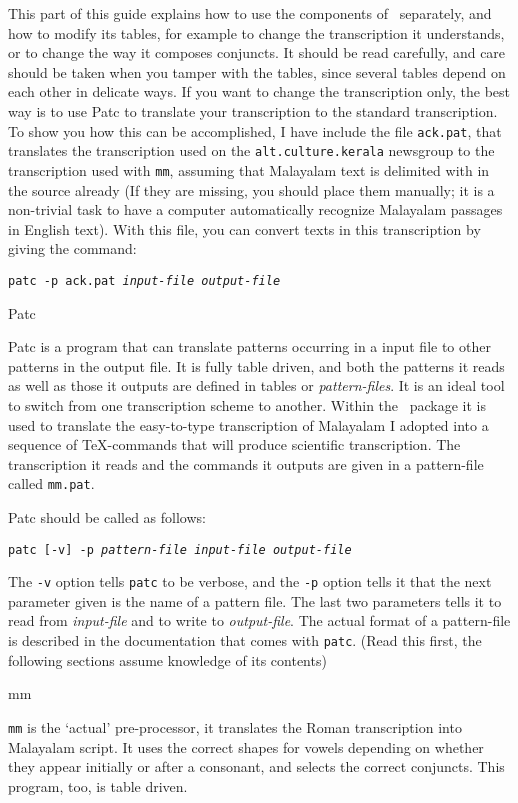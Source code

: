 This part of this guide explains how to use the components of
\MT\ separately, and how to modify its tables, for
example to change the transcription it understands, or to change the
way it composes conjuncts. It should be read carefully, and care
should be taken when you tamper with the tables, since several tables
depend on each other in delicate ways. If you want to change the
transcription only, the best way is to use Patc to translate your
transcription to the standard transcription. To show you how this
can be accomplished, I have include the file {\tt ack.pat}, that
translates the transcription used on the {\tt alt.culture.kerala} newsgroup
to the transcription used with {\tt mm}, assuming that Malayalam text
is delimited with {\tt\dollar} in the source already (If they are
missing, you should place them manually; it is a non-trivial
task to have a computer automatically recognize Malayalam passages in
English text). With this file, you can convert texts in this
transcription by giving the command:

\medskip
{\tt patc -p ack.pat {\it input-file output-file}}
\medskip

\beginsection Patc

Patc is a program that can translate patterns occurring in a input file
to other patterns in the output file. It is fully table driven, and
both the patterns it reads as well as those it outputs are defined in
tables or {\it pattern-files}. It is an ideal tool to switch from one
transcription scheme to another. Within the \MT\ package it
is used to translate the easy-to-type transcription of Malayalam I
adopted into a sequence of \TeX-commands that will produce scientific
transcription. The transcription it reads and the commands it outputs
are given in a pattern-file called {\tt mm.pat}.

Patc should be called as follows:

\medskip
{\tt patc [-v] -p {\it pattern-file input-file output-file}}
\medskip

The {\tt -v} option tells {\tt patc} to be verbose, and the {\tt -p}
option tells it that the next parameter given is the name of a
pattern file. The last two
parameters tells it to read from {\it input-file} and to write to
{\it output-file}. The actual format of a pattern-file
is described in the documentation that comes with {\tt patc}. (Read
this first, the following sections assume knowledge of its contents)

\beginsection mm

{\tt mm} is the `actual' pre-processor, it translates the Roman transcription into Malayalam
script. It uses the correct shapes for vowels depending on whether they
appear initially or after a consonant, and selects the correct
conjuncts. This program, too, is table driven.

